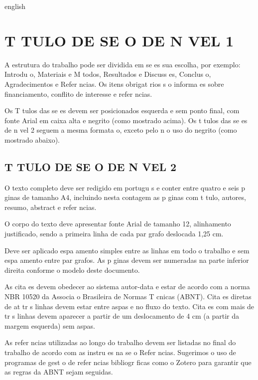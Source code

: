 \documentclass{article}
\begin{document}
\begin{paginadetitulo}
\begin{ambienteresumo}[Abstract]
\begin{otherlanguage*}{english}

\end{otherlanguage*}
\end{ambienteresumo}
\end{paginadetitulo}
\textual%

\section{T TULO DE SE O DE N VEL 1}\label{sec:intro}

A estrutura do trabalho pode ser dividida em se es   sua escolha, por exemplo: Introdu o, Materiais e M todos, Resultados e Discuss es, Conclus o, Agradecimentos e Refer ncias. Os itens obrigat rios s o informa es sobre financiamento, conflito de interesse e refer ncias.

Os T tulos das se es devem ser posicionados   esquerda e sem ponto final, com fonte Arial em caixa alta e negrito (como mostrado acima). Os t tulos das se es de n vel 2 seguem a mesma formata o, exceto pelo n o uso do negrito (como mostrado abaixo).

\subsection{T TULO DE SE O DE N VEL 2}

O texto completo deve ser redigido em portugu s e conter entre quatro e seis p ginas de tamanho A4, incluindo nesta contagem as p ginas com t tulo, autores, resumo, abstract e refer ncias.

O corpo do texto deve apresentar fonte Arial de tamanho 12, alinhamento justificado, sendo a primeira linha de cada par grafo deslocada 1,25 cm.

Deve ser aplicado espa amento simples entre as linhas em todo o trabalho e sem espa amento entre par grafos. As p ginas devem ser numeradas na parte inferior   direita conforme o modelo deste documento.

As cita es devem obedecer ao sistema autor-data e estar de acordo com a norma NBR 10520 da Associa o Brasileira de Normas T cnicas (ABNT). Cita es diretas de at  tr s linhas devem estar entre aspas e no fluxo do texto. Cita es com mais de tr s linhas devem aparecer a partir de um deslocamento de 4 cm (a partir da margem esquerda) sem aspas.

As refer ncias utilizadas ao longo do trabalho devem ser listadas no final do trabalho de acordo com as instru es na se o Refer ncias. Sugerimos o uso de programas de gest o de refer ncias bibliogr ficas como o Zotero para garantir que as regras da ABNT sejam seguidas.
\end{document}
